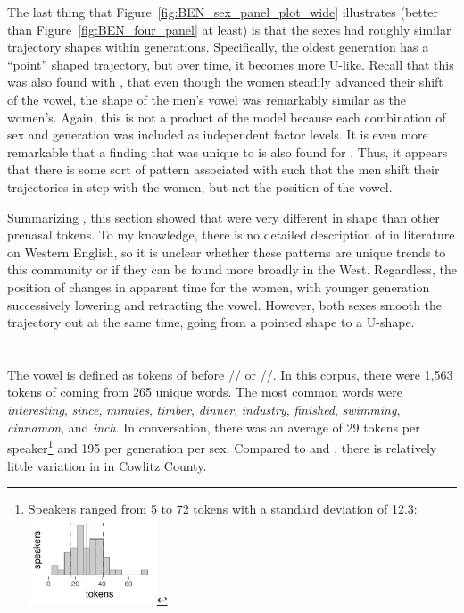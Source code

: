 The last thing that Figure~\ref{fig:BEN_sex_panel_plot_wide} illustrates (better than Figure~\ref{fig:BEN_four_panel} at least) is that the sexes had roughly similar trajectory shapes within generations. Specifically, the oldest generation has a ``point'' shaped trajectory, but over time, it becomes more U-like. Recall that this was also found with \bet, that even though the women steadily advanced their shift of the vowel, the shape of the men's vowel was remarkably similar as the women's. Again, this is not a product of the model because each combination of sex and generation was included as independent factor levels. It is even more remarkable that a finding that was unique to \bet is also found for \ben. Thus, it appears that there is some sort of pattern associated with \dress such that the men shift their trajectories in step with the women, but not the position of the vowel.

Summarizing \ben, this section showed that \ben were very different in shape than other prenasal tokens. To my knowledge, there is no detailed description of \ben in literature on Western English, so it is unclear whether these patterns are unique trends to this community or if they can be found more broadly in the West. Regardless, the position of \ben changes in apparent time for the women, with younger generation successively lowering and retracting the vowel. However, both sexes smooth the trajectory out at the same time, going from a pointed shape to a U-shape.



\section{\bin}
\label{BIN}

The \bin vowel is defined as tokens of \bit before // or //. In this corpus, there were 1,563 tokens of \bin coming from 265 unique words. The most common words were \textit{interesting}, \textit{since}, \textit{minutes}, \textit{timber}, \textit{dinner}, \textit{industry}, \textit{finished}, \textit{swimming}, \textit{cinnamon}, and \textit{inch}. In conversation, there was an average of 29 tokens per speaker\footnote{Speakers ranged from 5 to 72 tokens with a standard deviation of 12.3: \includegraphics[width = 1.5in]{Figures/BIN/BIN_tiny.pdf}} and 195 per generation per sex. Compared to \ban and \ben, there is relatively little variation in \bin in Cowlitz County.

